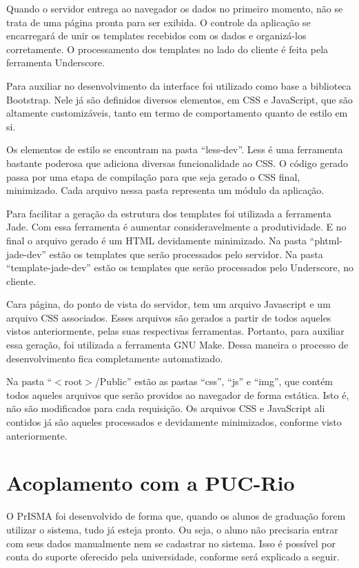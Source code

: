 \documentclass[graduacao,brazil]{ThesisPUC}
\begin{document}
Quando o servidor entrega ao navegador os dados no primeiro momento, não se trata de uma página pronta para ser exibida. O controle da aplicação se encarregará de unir os templates recebidos com os dados e organizá-los corretamente. O processamento dos templates no lado do cliente é feita pela ferramenta Underscore\cite{Underscore}.

Para auxiliar no desenvolvimento da interface foi utilizado como base a biblioteca Bootstrap\cite{Bootstrap}. Nele já são definidos diversos elementos, em CSS e JavaScript, que são altamente customizáveis, tanto em termo de comportamento quanto de estilo em si.

Os elementos de estilo se encontram na pasta “less-dev”. Less\cite{Less} é uma ferramenta bastante poderosa que adiciona diversas funcionalidade ao CSS. O código gerado passa por uma etapa de compilação para que seja gerado o CSS final, minimizado. Cada arquivo nessa pasta representa um módulo da aplicação.

Para facilitar a geração da estrutura dos templates foi utilizada a ferramenta Jade\cite{Jade}. Com essa ferramenta é aumentar consideravelmente a produtividade. E no final o arquivo gerado é um HTML devidamente minimizado. Na pasta “phtml-jade-dev” estão os templates que serão processados pelo servidor. Na pasta “template-jade-dev” estão os templates que serão processados pelo Underscore\cite{Underscore}, no cliente.

Cara página, do ponto de vista do servidor, tem um arquivo Javascript e um arquivo CSS associados. Esses arquivos são gerados a partir de todos aqueles vistos anteriormente, pelas suas respectivas ferramentas. Portanto, para auxiliar essa geração, foi utilizada a ferramenta GNU Make. Dessa maneira o processo de desenvolvimento fica completamente automatizado.

Na pasta “$<$root$>$/Public” estão as pastas “css”, “js” e “img”, que contém todos aqueles arquivos que serão providos ao navegador de forma estática. Isto é, não são modificados para cada requisição. Os arquivos CSS e JavaScript ali contidos já são aqueles processados e devidamente minimizados, conforme visto anteriormente.

\section{Acoplamento com a PUC-Rio}

O PrISMA foi desenvolvido de forma que, quando os alunos de graduação forem utilizar o sistema, tudo já esteja pronto. Ou seja, o aluno não precisaria entrar com seus dados manualmente nem se cadastrar no sistema. Isso é possível por conta do suporte oferecido pela universidade, conforme será explicado a seguir.
\end{document}
